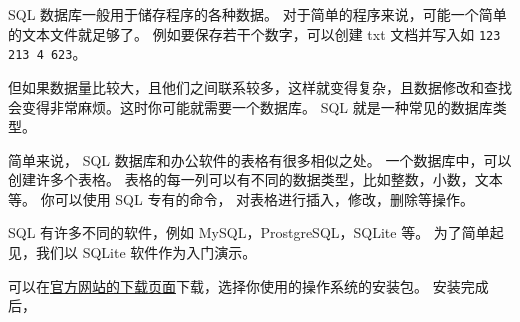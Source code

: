 
SQL 数据库一般用于储存程序的各种数据。 对于简单的程序来说，可能一个简单的文本文件就足够了。 例如要保存若干个数字，可以创建 txt 文档并写入如 \verb|123 213 4 623|。

但如果数据量比较大，且他们之间联系较多，这样就变得复杂，且数据修改和查找会变得非常麻烦。这时你可能就需要一个数据库。 SQL 就是一种常见的数据库类型。

简单来说， SQL 数据库和办公软件的表格有很多相似之处。 一个数据库中，可以创建许多个表格。 表格的每一列可以有不同的数据类型，比如整数，小数，文本等。 你可以使用 SQL 专有的命令， 对表格进行插入，修改，删除等操作。

SQL 有许多不同的软件，例如 MySQL，ProstgreSQL，SQLite 等。 为了简单起见，我们以 SQLite 软件作为入门演示。

可以在\href{https://sqlitebrowser.org/dl/}{官方网站的下载页面}下载，选择你使用的操作系统的安装包。 安装完成后，







